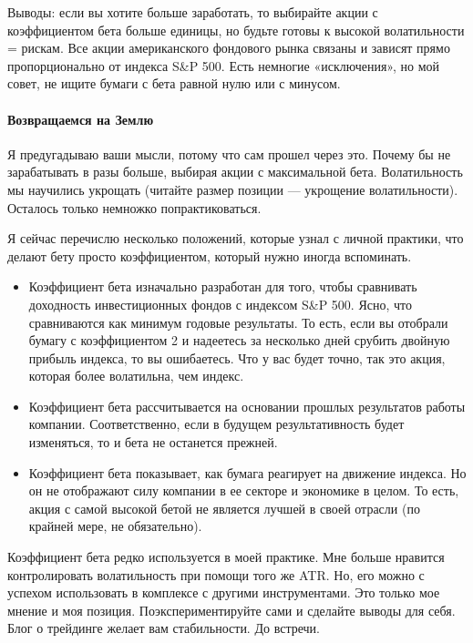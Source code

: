 \documentclass[a5paper]{article}
\begin{document}
Выводы: если вы хотите больше заработать, то выбирайте акции с
коэффициентом бета больше единицы, но будьте готовы к высокой
волатильности = рискам. Все акции американского фондового рынка
связаны и зависят прямо пропорционально от индекса S\&P 500. Есть
немногие «исключения», но мой совет, не ищите бумаги с бета равной
нулю или с минусом.

\paragraph{Возвращаемся на Землю}

Я предугадываю ваши мысли, потому что сам прошел через это. Почему бы не зарабатывать в разы больше, выбирая акции с максимальной бета. Волатильность мы научились укрощать (читайте размер позиции — укрощение волатильности). Осталось только немножко попрактиковаться.

Я сейчас перечислю несколько положений, которые узнал с личной
практики, что делают бету просто коэффициентом, который нужно иногда
вспоминать.

\begin{itemize}

\item     Коэффициент бета изначально разработан для того, чтобы сравнивать доходность инвестиционных фондов с индексом S\&P 500. Ясно, что сравниваются как минимум годовые результаты. То есть, если вы отобрали бумагу с коэффициентом 2 и надеетесь за несколько дней срубить двойную прибыль  индекса, то вы ошибаетесь. Что у вас будет точно, так это акция, которая более волатильна, чем индекс.
\item     Коэффициент бета рассчитывается на основании прошлых результатов работы компании. Соответственно, если в будущем результативность будет изменяться, то и бета не останется прежней.
\item     Коэффициент бета показывает, как бумага реагирует на движение индекса. Но он не отображают силу компании в ее секторе и экономике в целом. То есть, акция с самой высокой бетой не является лучшей в своей отрасли (по крайней мере, не обязательно).
\end{itemize}

Коэффициент бета редко используется в моей практике. Мне больше нравится контролировать волатильность при помощи того же ATR. Но, его можно с успехом использовать в комплексе с другими инструментами. Это только мое мнение и моя позиция. Поэкспериментируйте сами и сделайте выводы для себя. Блог о трейдинге желает вам стабильности. До встречи.
\end{document}
